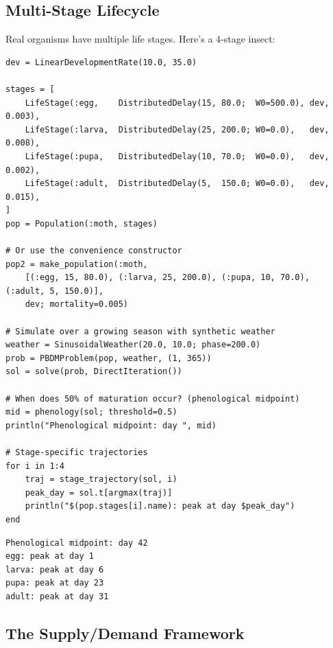\subsection{Multi-Stage Lifecycle}



\label{6982608542494243133}{}


Real organisms have multiple life stages. Here’s a 4-stage insect:




\begin{verbatim}
dev = LinearDevelopmentRate(10.0, 35.0)

stages = [
    LifeStage(:egg,    DistributedDelay(15, 80.0;  W0=500.0), dev, 0.003),
    LifeStage(:larva,  DistributedDelay(25, 200.0; W0=0.0),   dev, 0.008),
    LifeStage(:pupa,   DistributedDelay(10, 70.0;  W0=0.0),   dev, 0.002),
    LifeStage(:adult,  DistributedDelay(5,  150.0; W0=0.0),   dev, 0.015),
]
pop = Population(:moth, stages)

# Or use the convenience constructor
pop2 = make_population(:moth,
    [(:egg, 15, 80.0), (:larva, 25, 200.0), (:pupa, 10, 70.0), (:adult, 5, 150.0)],
    dev; mortality=0.005)

# Simulate over a growing season with synthetic weather
weather = SinusoidalWeather(20.0, 10.0; phase=200.0)
prob = PBDMProblem(pop, weather, (1, 365))
sol = solve(prob, DirectIteration())

# When does 50% of maturation occur? (phenological midpoint)
mid = phenology(sol; threshold=0.5)
println("Phenological midpoint: day ", mid)

# Stage-specific trajectories
for i in 1:4
    traj = stage_trajectory(sol, i)
    peak_day = sol.t[argmax(traj)]
    println("$(pop.stages[i].name): peak at day $peak_day")
end
\end{verbatim}




\begin{verbatim}
Phenological midpoint: day 42
egg: peak at day 1
larva: peak at day 6
pupa: peak at day 23
adult: peak at day 31
\end{verbatim}



\subsection{The Supply/Demand Framework}



\label{15439850547801033977}{}


